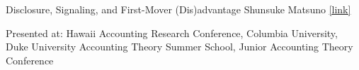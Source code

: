 \paperentry
	{Disclosure, Signaling, and First-Mover (Dis)advantage}   %
	{Shunsuke Matsuno}   %
	{}   %
	{\href{https://papers.ssrn.com/sol3/papers.cfm?abstract_id=4985567}{[link]}}  %
	{}   %
	{}   %
	{
	\begin{cvitems}  %
		\item {Presented at: Hawaii Accounting Research Conference, Columbia University, Duke University Accounting Theory Summer School, Junior Accounting Theory Conference}
	\end{cvitems}
	}
	{}




	
